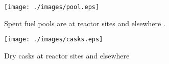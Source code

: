 

  \begin{figure}[htbp!]
    \begin{center}
    \begin{minipage}[t]{0.45\textwidth}
      \texttt{[image: ./images/pool.eps]}
      \caption{Spent fuel pools are at reactor sites and elsewhere 
        \cite{doe_spent_????}.}
        \label{fig:pool}
    \end{minipage}
    \hspace{0.01\textwidth}
    \begin{minipage}[t]{0.45\textwidth}
      \texttt{[image: ./images/casks.eps]}
      \caption{Dry casks at reactor sites and elsewhere \cite{nrc_dry_2008}}
        \label{fig:casks}
    \end{minipage}
    \end{center}
  \end{figure}

